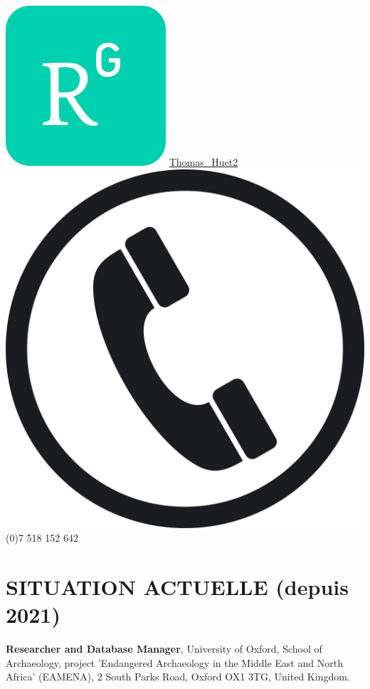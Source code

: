 \documentclass{article}
\begin{document}
\includegraphics[scale=0.050]{rgate} \quad \href{https://www.researchgate.net/profile/Thomas\_Huet2}{Thomas\_Huet2} \\
\includegraphics[scale=0.005]{phone} \quad  {} (0)7 518 152 642 \\

\section{SITUATION ACTUELLE (depuis 2021)}
\textbf{Researcher and Database Manager}, University of Oxford, School of Archaeology, project 'Endangered Archaeology in the Middle East and North Africa' (EAMENA), 2 South Parks Road, Oxford OX1 3TG, United Kingdom.
\end{document}
